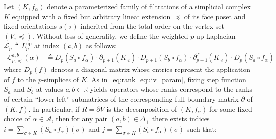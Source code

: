
Let $(K, f_\alpha)$ denote a parameterized family of filtrations of a simplicial complex $K$ equipped with a fixed but arbitrary linear extension $ \preceq$ of its face poset and fixed orientations $s(\sigma)$ inherited from the total order on the vertex set $(V, \preceq)$.
Without loss of generality, we define the weighted $p$ up-Laplacian $\mathcal{L}_p \triangleq  L_p^{\mathrm{up}}$ at index $(a, b)$ as follows: 
\begin{align}\label{eq:laplacian_decouple}
\mathcal{L}_{p, \preceq}^{a,b}(\alpha) & \triangleq D_p(\bar{S}_a \circ f_\alpha) \cdot \partial_{p+1}(K_\preceq) \cdot D_{p+1}(S_b \circ f_\alpha) \cdot \partial_{p+1}^T(K_\preceq) \cdot D_p(\bar{S}_a \circ f_\alpha) 
\end{align}
where $D_p(f)$ denotes a diagonal matrix whose entries represent the application of $f$ to the $p$-simplices of $K$.
As in~\eqref{eq:rank_equiv_param}, fixing step function $S_a$ and $\bar{S}_b$ at values $a, b \in \mathbb{R}$ yields operators whose ranks correspond to the ranks of certain ``lower-left'' submatrices of the corresponding full boundary matrix $\partial$ of $(K, f)$. 
In particular, if $R = \partial V$ is the decomposition of $(K, f_\alpha)$ for some fixed choice of $\alpha \in \mathcal{A}$, then for any pair $(a,b)\in \Delta_+$ there exists indices $i = \sum_{\sigma \in K} (S_a \circ f_\alpha)(\sigma)$ and $j = \sum_{\sigma \in K} (S_b \circ f_\alpha)(\sigma)$ such that:
